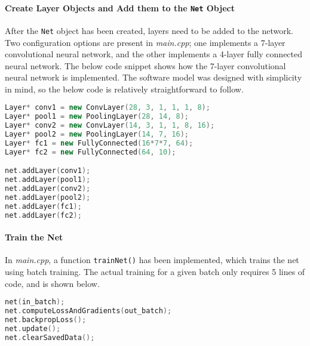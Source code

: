 \paragraph{Create Layer Objects and Add them to the \texttt{Net} Object} 
After the \texttt{Net} object has been created, layers need to be added to the network. Two configuration options are present in \textit{main.cpp}; one implements a 7-layer convolutional neural network, and the other implements a 4-layer fully connected neural network. The below code snippet shows how the 7-layer convolutional neural network is implemented. The software model was designed with simplicity in mind, so the below code is relatively straightforward to follow.
\begin{lstlisting}[language=c++]
Layer* conv1 = new ConvLayer(28, 3, 1, 1, 1, 8);
Layer* pool1 = new PoolingLayer(28, 14, 8);
Layer* conv2 = new ConvLayer(14, 3, 1, 1, 8, 16);
Layer* pool2 = new PoolingLayer(14, 7, 16);
Layer* fc1 = new FullyConnected(16*7*7, 64);
Layer* fc2 = new FullyConnected(64, 10);

net.addLayer(conv1);
net.addLayer(pool1);
net.addLayer(conv2);
net.addLayer(pool2);
net.addLayer(fc1);
net.addLayer(fc2);
\end{lstlisting}

\paragraph{Train the Net}
In \textit{main.cpp}, a function \texttt{trainNet()} has been implemented, which trains the net using batch training. The actual training for a given batch only requires 5 lines of code, and is shown below.
\begin{lstlisting}[language=c++]
net(in_batch);
net.computeLossAndGradients(out_batch);
net.backpropLoss();
net.update();
net.clearSavedData();
\end{lstlisting}
